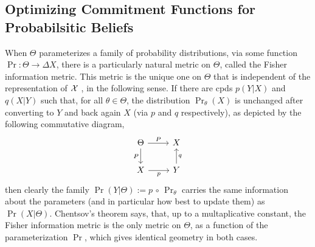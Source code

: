 


\subsection{Optimizing Commitment Functions for Probabilsitic Beliefs}
When $\Theta$ parameterizes a family of probability distributions, via some function $\Pr : \Theta \to \Delta X$, there is a particularly natural metric on $\Theta$, called the Fisher information metric.
This metric is the unique one on $\Theta$ that is independent of the representation of $\mathcal X$ \parencite{chentsov}, in the following sense.
If there are cpds $p(Y|X)$ and $q(X|Y)$ such that, for all $\theta \in \Theta$,
the distribution $\Pr_{\theta}(X)$ is unchanged after converting to $Y$ and back again $X$ (via $p$ and $q$ respectively), as depicted by the following commutative diagram,
\[
	\begin{tikzcd}
		\Theta \ar[r,"\Pr"]\ar[d,"\Pr"']
			& X \\
		X \ar[r,"p"'] & Y \ar[u, "q"']
	\end{tikzcd}
\]
then clearly the family $\Pr(Y|\Theta) := p\,\circ\,\Pr_{\theta}$ carries the same information about the parameters (and in particular how best to update them) as $\Pr(X|\Theta)$.
Chentsov's theorem says, that, up to a multaplicative constant, the Fisher information metric is the only metric on $\Theta$, as a function of the parameterization $\Pr$, which gives identical geometry in both cases.


